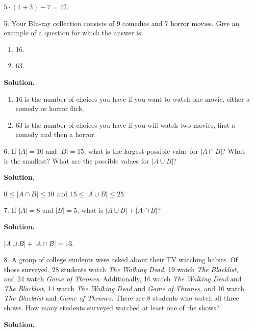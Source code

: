 \documentclass[10pt,]{book}
\theoremstyle{plain}
\theoremstyle{definition}
\theoremstyle{definition}
\theoremstyle{definition}
\numberwithin{equation}{section}
\begin{document}
\begin{exerciselist}
\(5\cdot (4+3) + 7 = 42\).
%
\item[5.]\hypertarget{exercise-46}{}
Your Blu-ray collection consists of 9 comedies and 7 horror movies. Give an example of a question for which the answer is:
%
\leavevmode%
\begin{enumerate}[label=(\alph*)]
\item\hypertarget{li-376}{}
16.
%
\item\hypertarget{li-377}{}
63.
%
\end{enumerate}
\par\smallskip
\par\smallskip
\noindent\textbf{Solution.}\hypertarget{solution-69}{}\quad
\leavevmode%
\begin{enumerate}[label=(\alph*)]
\item\hypertarget{li-378}{}
16 is the number of choices you have if you want to watch one movie, either a comedy or horror flick.
%
\item\hypertarget{li-379}{}
63 is the number of choices you have if you will watch two movies, first a comedy and then a horror.
%
\end{enumerate}
\item[6.]\hypertarget{exercise-47}{}
If \(|A| = 10\) and \(|B| = 15\), what is the largest possible value for \(|A \cap B|\)? What is the smallest? What are the possible values for \(|A \cup B|\)?
%
\par\smallskip
\par\smallskip
\noindent\textbf{Solution.}\hypertarget{solution-70}{}\quad

\(0 \le |A \cap B| \le 10\) and \(15 \le |A \cup B| \le 25\).
%
\item[7.]\hypertarget{exercise-48}{}
If \(|A| = 8\) and \(|B| = 5\), what is \(|A \cup B| + |A \cap B|\)?
%
\par\smallskip
\par\smallskip
\noindent\textbf{Solution.}\hypertarget{solution-71}{}\quad

\(|A \cup B| + |A \cap B| = 13\).
%
\item[8.]\hypertarget{exercise-49}{}
A group of college students were asked about their TV watching habits. Of those surveyed, 28 students watch \emph{The Walking Dead}, 19 watch \emph{The Blacklist}, and 24 watch \emph{Game of Thrones}. Additionally, 16 watch \emph{The Walking Dead} and \emph{The Blacklist}, 14 watch \emph{The Walking Dead} and \emph{Game of Thrones}, and 10 watch \emph{The Blacklist} and \emph{Game of Thrones}. There are 8 students who watch all three shows. How many students surveyed watched at least one of the shows?
%
\par\smallskip
\par\smallskip
\noindent\textbf{Solution.}\hypertarget{solution-72}{}\quad


\end{exerciselist}
\end{document}
